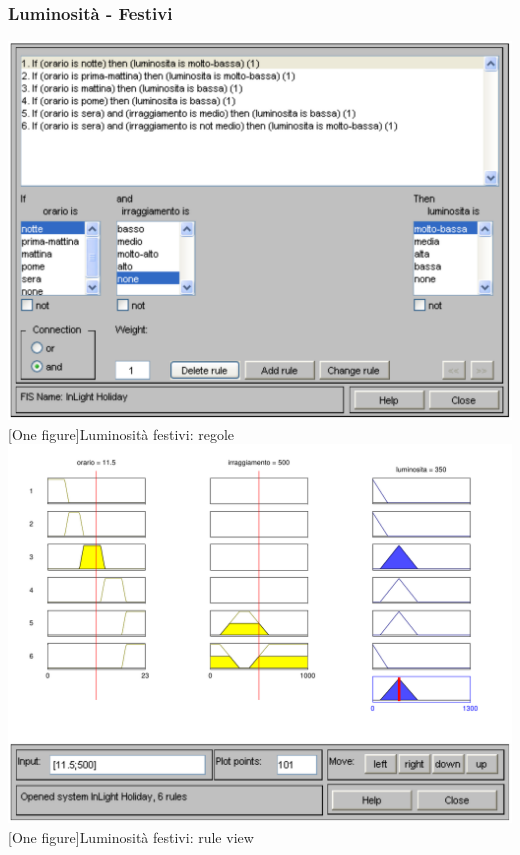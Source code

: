 \subsubsection{Luminosità - Festivi}
\vspace{20px}
\includegraphics[scale=0.5]{images/fuzzy/luminosita_festivi_regole.pdf}
[One figure]{Luminosità festivi: regole}
\vspace{20px}
\includegraphics[scale=0.5]{images/fuzzy/luminosita_festivi_rule_view.pdf}
[One figure]{Luminosità festivi: rule view}
\vspace{20px}
